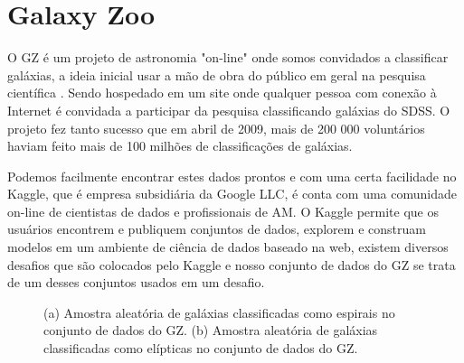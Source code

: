 \chapter{Galaxy Zoo} 

O GZ é um projeto de astronomia "on-line" onde somos convidados a classificar galáxias, a ideia inicial usar a mão de obra do público em geral na pesquisa científica \cite{Raddick_2010}. Sendo hospedado em um site onde qualquer pessoa com conexão à Internet é convidada a participar da pesquisa classificando galáxias do SDSS. O projeto fez tanto sucesso que em abril de 2009, mais de 200 000 voluntários haviam feito mais de 100 milhões de classificações de galáxias. 

Podemos facilmente encontrar estes dados prontos e com uma certa facilidade no Kaggle, que é empresa subsidiária da Google LLC, é conta com uma comunidade on-line de cientistas de dados e profissionais de AM. O Kaggle permite que os usuários encontrem e publiquem conjuntos de dados, explorem e construam modelos em um ambiente de ciência de dados baseado na web, existem diversos desafios que são colocados pelo Kaggle e nosso conjunto de dados do GZ se trata de um desses conjuntos usados em um desafio. 

\begin{figure}[!ht] 
\centering 
{} 
\qquad 
{} 
\caption{(a) Amostra aleatória de galáxias classificadas como espirais no conjunto de dados do GZ. (b) Amostra aleatória de galáxias classificadas como elípticas no conjunto de dados do GZ.} 
\label{fig:juwdidj} 
\end{figure} 
